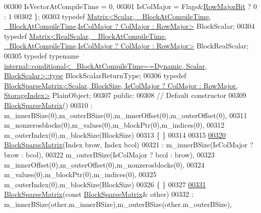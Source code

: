 \begin{DoxyCode}
00300       IsVectorAtCompileTime = 0,
00301       IsColMajor = Flags&\hyperlink{group__flags_gae4f56c2a60bbe4bd2e44c5b19cbe8762}{RowMajorBit} ? 0 : 1
00302     \};
00303     \textcolor{keyword}{typedef} 
      \hyperlink{group___core___module_class_eigen_1_1_matrix}{Matrix<Scalar, \_BlockAtCompileTime, \_BlockAtCompileTime,IsColMajor ? ColMajor : RowMajor>}
       BlockScalar;
00304     \textcolor{keyword}{typedef} 
      \hyperlink{group___core___module_class_eigen_1_1_matrix}{Matrix<RealScalar, \_BlockAtCompileTime, \_BlockAtCompileTime,IsColMajor ? ColMajor : RowMajor>}
       BlockRealScalar;
00305     \textcolor{keyword}{typedef} \textcolor{keyword}{typename} 
      \hyperlink{class_eigen_1_1internal_1_1_tensor_lazy_evaluator_writable}{internal::conditional<\_BlockAtCompileTime==Dynamic, Scalar, BlockScalar>::type}
       BlockScalarReturnType;
00306     \textcolor{keyword}{typedef} 
      \hyperlink{group___sparse_core___module_class_eigen_1_1_block_sparse_matrix}{BlockSparseMatrix<Scalar, BlockSize, IsColMajor ? ColMajor : RowMajor, StorageIndex>}
       PlainObject;
00307   \textcolor{keyword}{public}:
00308     \textcolor{comment}{// Default constructor}
00309     \hyperlink{group___sparse_core___module_class_eigen_1_1_block_sparse_matrix}{BlockSparseMatrix}()
00310     : m\_innerBSize(0),m\_outerBSize(0),m\_innerOffset(0),m\_outerOffset(0),
00311       m\_nonzerosblocks(0),m\_values(0),m\_blockPtr(0),m\_indices(0),
00312       m\_outerIndex(0),m\_blockSize(BlockSize)
00313     \{ \}
00314 
00315 
\hyperlink{group___sparse_core___module_a319d4ed434693fc09cdb7d71e090bbd8}{00320}     \hyperlink{group___sparse_core___module_a319d4ed434693fc09cdb7d71e090bbd8}{BlockSparseMatrix}(Index brow, Index bcol)
00321       : m\_innerBSize(IsColMajor ? brow : bcol),
00322         m\_outerBSize(IsColMajor ? bcol : brow),
00323         m\_innerOffset(0),m\_outerOffset(0),m\_nonzerosblocks(0),
00324         m\_values(0),m\_blockPtr(0),m\_indices(0),
00325         m\_outerIndex(0),m\_blockSize(BlockSize)
00326     \{ \}
00327 
\hyperlink{group___sparse_core___module_a5d0b6ea10540a0968410daf3b1ff99e8}{00331}     \hyperlink{group___sparse_core___module_a5d0b6ea10540a0968410daf3b1ff99e8}{BlockSparseMatrix}(\textcolor{keyword}{const} \hyperlink{group___sparse_core___module_class_eigen_1_1_block_sparse_matrix}{BlockSparseMatrix}& other)
00332       : m\_innerBSize(other.m\_innerBSize),m\_outerBSize(other.m\_outerBSize),

\end{DoxyCode}
